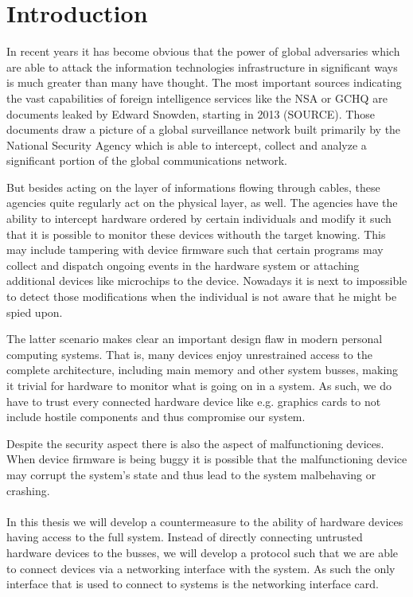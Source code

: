 \section{Introduction}

In recent years it has become obvious that the power of global adversaries which are able to attack the information technologies infrastructure in significant ways is much greater than many have thought.
The most important sources indicating the vast capabilities of foreign intelligence services like the NSA or GCHQ are documents leaked by Edward Snowden, starting in 2013 (SOURCE).
Those documents draw a picture of a global surveillance network built primarily by the National Security Agency which is able to intercept, collect and analyze a significant portion of the global communications network.

But besides acting on the layer of informations flowing through cables, these agencies quite regularly act on the physical layer, as well.
The agencies have the ability to intercept hardware ordered by certain individuals and modify it such that it is possible to monitor these devices withouth the target knowing.
This may include tampering with device firmware such that certain programs may collect and dispatch ongoing events in the hardware system or attaching additional devices like microchips to the device.
Nowadays it is next to impossible to detect those modifications when the individual is not aware that he might be spied upon.

The latter scenario makes clear an important design flaw in modern personal computing systems.
That is, many devices enjoy unrestrained access to the complete architecture, including main memory and other system busses, making it trivial for hardware to monitor what is going on in a system.
As such, we do have to trust every connected hardware device like e.g. graphics cards to not include hostile components and thus compromise our system.

Despite the security aspect there is also the aspect of malfunctioning devices.
When device firmware is being buggy it is possible that the malfunctioning device may corrupt the system's state and thus lead to the system malbehaving or crashing.
\\\\
In this thesis we will develop a countermeasure to the ability of hardware devices having access to the full system.
Instead of directly connecting untrusted hardware devices to the busses, we will develop a protocol such that we are able to connect devices via a networking interface with the system.
As such the only interface that is used to connect to systems is the networking interface card.

